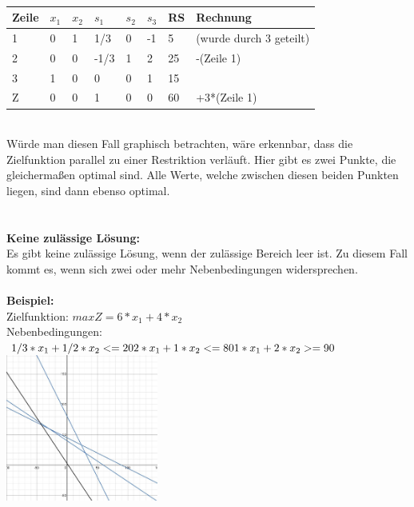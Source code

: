 \\
\begin{table}[!ht]
\begin{tabular}{|l|l|l|l|l|l|l|l|}
\hline
\rowcolor[HTML]{C0C0C0} 
Zeile                     & $x_1$ & $x_2$ & $s_1$   & $s_2$ & $s_3$ & RS & Rechnung                \\ \hline
\rowcolor[HTML]{FFFFFF} 
\cellcolor[HTML]{C0C0C0}1 & 0  & 1  & 1/3  & 0  & -1 & 5  & (wurde durch 3 geteilt) \\ \hline
\rowcolor[HTML]{FFFFFF} 
\cellcolor[HTML]{C0C0C0}2 & 0  & 0  & -1/3 & 1  & 2  & 25 & -(Zeile 1)              \\ \hline
\rowcolor[HTML]{FFFFFF} 
\cellcolor[HTML]{C0C0C0}3 & 1  & 0  & 0    & 0  & 1  & 15 &                         \\ \hline
\rowcolor[HTML]{FFFFFF} 
\cellcolor[HTML]{C0C0C0}Z & 0  & 0  & 1    & 0  & 0  & 60 & +3*(Zeile 1)            \\ \hline
\end{tabular}
\end{table}
\\
Würde man diesen Fall graphisch betrachten, wäre erkennbar, dass die Zielfunktion parallel zu einer Restriktion verläuft. Hier gibt es zwei Punkte, die gleichermaßen optimal sind. Alle Werte, welche zwischen diesen beiden Punkten liegen, sind dann ebenso optimal.\\\\\\
\textbf{Keine zulässige Lösung: }\\
Es gibt keine zulässige Lösung, wenn der zulässige Bereich leer ist. Zu diesem Fall kommt es, wenn sich zwei oder mehr Nebenbedingungen widersprechen.\\\\
\textbf {Beispiel:}\\
Zielfunktion: \begin{math}max Z = 6*x_1+4*x_2\end{math}\\
Nebenbedingungen:\\
\begin{math}
1/3*x_1+1/2*x_2 <= 20\\
2*x_1+1*x_2 <= 80\\
1*x_1+2*x_2 >= 90\\
\end{math}
\includegraphics[width = 5cm, right]{images/IMG_keine_Losung.jpeg}
